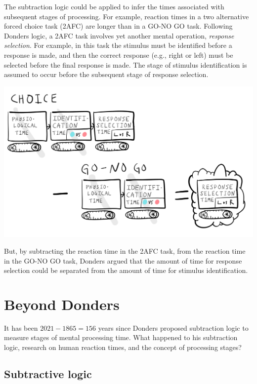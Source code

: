 \documentclass[
  oneside,
  12pt]{crumpbook}
\begin{document}
The subtraction logic could be applied to infer the times associated with subsequent stages of processing. For example, reaction times in a two alternative forced choice task (2AFC) are longer than in a GO-NO GO task. Following Donders logic, a 2AFC task involves yet another mental operation, \emph{response selection}. For example, in this task the stimulus must be identified before a response is made, and then the correct response (e.g., right or left) must be selected before the final response is made. The stage of stimulus identification is assumed to occur before the subsequent stage of response selection.

\begin{center}\includegraphics[width=1\linewidth]{imgs/Donders_RT_time} \end{center}

But, by subtracting the reaction time in the 2AFC task, from the reaction time in the GO-NO GO task, Donders argued that the amount of time for response selection could be separated from the amount of time for stimulus identification.

\hypertarget{beyond-donders}{%
\section{Beyond Donders}\label{beyond-donders}}

It has been \(2021 - 1865 = 156\) years since Donders proposed subtraction logic to measure stages of mental processing time. What happened to his subtraction logic, research on human reaction times, and the concept of processing stages?

\hypertarget{subtractive-logic}{%
\subsection{Subtractive logic}\label{subtractive-logic}}
\end{document}
